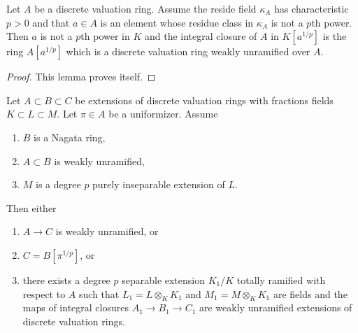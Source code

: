 \begin{lemma}
\label{lemma-pre-purely-inseparable-case}
Let $A$ be a discrete valuation ring. Assume the reside field $\kappa_A$ has
characteristic $p > 0$ and that $a \in A$ is an element whose residue
class in $\kappa_A$ is not a $p$th power. Then $a$ is not a $p$th power in $K$
and the integral closure of $A$ in $K[a^{1/p}]$ is the ring $A[a^{1/p}]$
which is a discrete valuation ring weakly unramified over $A$.
\end{lemma}

\begin{proof}
This lemma proves itself.
\end{proof}

\begin{lemma}
\label{lemma-purely-inseparable-case}
Let $A \subset B \subset C$ be extensions of discrete valuation rings
with fractions fields $K \subset L \subset M$. Let $\pi \in A$ be a
uniformizer. Assume
\begin{enumerate}
\item $B$ is a Nagata ring,
\item $A \subset B$ is weakly unramified,
\item $M$ is a degree $p$ purely inseparable extension of $L$.
\end{enumerate}
Then either
\begin{enumerate}
\item $A \to C$ is weakly unramified, or
\item $C = B[\pi^{1/p}]$, or
\item there exists a degree $p$ separable extension $K_1/K$
totally ramified with respect to $A$
such that $L_1 = L \otimes_K K_1$ and $M_1 = M \otimes_K K_1$
are fields and the maps of integral closures $A_1 \to B_1 \to C_1$
are weakly unramified extensions of discrete valuation rings.
\end{enumerate}
\end{lemma}

